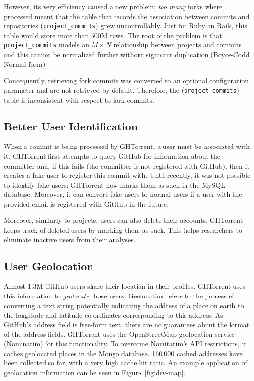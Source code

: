 \documentclass{sig-alternate}
\begin{document}
However, its very efficiency caused a new problem; \emph{too many} forks where
processed meant that the table that records the association between commits and
repositories (\texttt{project\_\-commits}) grew uncontrollably. Just for Ruby on
Rails, this table would store more than 500M rows. The root of the problem
is that \texttt{project\_commits} models an $M \times N$ relationship between
projects and commits and this cannot be normalized further without signicant
duplication (Boyce-Codd Normal form).

Concequently, retrieving fork commits was converted to an optional
configuration parameter and are not retrieved by default. Therefore, the
(\texttt{project\_\-commits}) table is inconsistent with respect to
fork commits.

\subsection{Better User Identification}

When a commit is being processed by GHTorrent, a user must be associated with it.
GHTorrent first attempts to query GitHub for information about the committer
and, if this fails (the committer is not registered with GitHub), then it
creates a fake user to register this commit with. Until recently, it was not
possible to identify fake users; GHTorrent now marks them as such in the MySQL
database. Moreover, it can convert fake users to normal users if a user with
the provided email is registered with GitHub in the future.

Moreover, similarly to projects, users can also delete their accounts.
GHTorrent keeps track of deleted users by marking them as such. This helps
researchers to eliminate inactive users from their analyses.

\subsection{User Geolocation}

Almost 1.3M GitHub users share their location in their profiles. GHTorrent uses
this information to \emph{geolocate} those users. Geolocation refers to the
process of converting a text string potentially indicating the address of a
place on earth to the longitude and latitude co-ordinates corresponding to this
address. As GitHub's address field is free-form text, there are no guarantees
about the format of the address fields. GHTorrent uses the OpenStreetMap
geolocation service (Nominatim) for this functionality. To overcome Nomitatim's
API restrictions, it caches geolocated places in the Mongo database. 160,000
cached addresses have been collected so far, with a very high cache hit ratio.
An example application of geolocation information can be seen in
Figure~\ref{fig:dev-map}.
\end{document}
